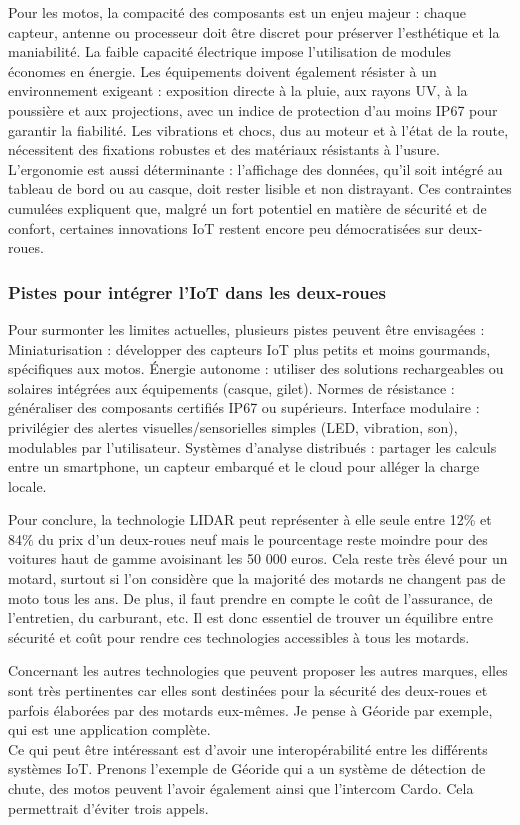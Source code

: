 Pour les motos, la compacité des composants est un enjeu majeur : chaque capteur, antenne ou processeur doit être discret pour préserver l’esthétique et la maniabilité. La faible capacité électrique impose l’utilisation de modules économes en énergie. Les équipements doivent également résister à un environnement exigeant : exposition directe à la pluie, aux rayons UV, à la poussière et aux projections, avec un indice de protection d’au moins IP67 pour garantir la fiabilité.
Les vibrations et chocs, dus au moteur et à l’état de la route, nécessitent des fixations robustes et des matériaux résistants à l’usure. L’ergonomie est aussi déterminante : l’affichage des données, qu’il soit intégré au tableau de bord ou au casque, doit rester lisible et non distrayant. Ces contraintes cumulées expliquent que, malgré un fort potentiel en matière de sécurité et de confort, certaines innovations IoT restent encore peu démocratisées sur deux-roues.


\subsubsection{Pistes pour intégrer l’IoT dans les deux-roues}
Pour surmonter les limites actuelles, plusieurs pistes peuvent être envisagées :
Miniaturisation : développer des capteurs IoT plus petits et moins gourmands, spécifiques aux motos.
Énergie autonome : utiliser des solutions rechargeables ou solaires intégrées aux équipements (casque, gilet).
Normes de résistance : généraliser des composants certifiés IP67 ou supérieurs.
Interface modulaire : privilégier des alertes visuelles/sensorielles simples (LED, vibration, son), modulables par l’utilisateur.
Systèmes d’analyse distribués : partager les calculs entre un smartphone, un capteur embarqué et le cloud pour alléger la charge locale.
\vspace{0.5cm}

Pour conclure, la technologie LIDAR peut représenter à elle seule entre 12\% et 84\% du prix d'un deux-roues neuf mais le pourcentage reste moindre pour des voitures haut de gamme avoisinant les 50 000 euros. Cela reste très élevé pour un motard, surtout si l'on considère que la majorité des motards ne changent pas de moto tous les ans. De plus, il faut prendre en compte le coût de l'assurance, de l'entretien, du carburant, etc. Il est donc essentiel de trouver un équilibre entre sécurité et coût pour rendre ces technologies accessibles à tous les motards.

Concernant les autres technologies que peuvent proposer les autres marques, elles sont très pertinentes car elles sont destinées pour la sécurité des deux-roues et parfois élaborées par des motards eux-mêmes. Je pense à Géoride par exemple, qui est une application complète.\\
Ce qui peut être intéressant est d'avoir une interopérabilité entre les différents systèmes IoT. Prenons l'exemple de Géoride qui a un système de détection de chute, des motos peuvent l'avoir également ainsi que l'intercom Cardo. Cela permettrait d'éviter trois appels.

